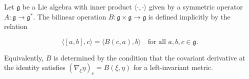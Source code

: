 Let $\mathfrak{g}$ be a Lie algebra with inner product $\langle \cdot, \cdot \rangle$ given by a symmetric operator $A: \mathfrak{g} \to \mathfrak{g}^*$. The bilinear operation $B: \mathfrak{g} \times \mathfrak{g} \to \mathfrak{g}$ is defined implicitly by the relation

$$\langle [a, b], c \rangle = \langle B(c, a), b \rangle \quad \text{for all } a, b, c \in \mathfrak{g}.$$

Equivalently, $B$ is determined by the condition that the covariant derivative at the identity satisfies $(\nabla_\xi \eta)_e = B(\xi, \eta)$ for a left-invariant metric.
